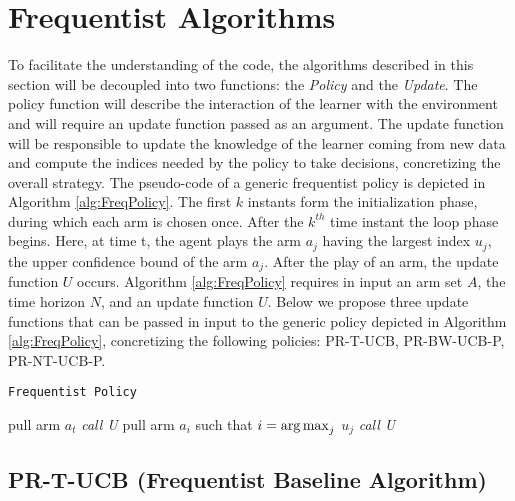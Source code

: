 \section{Frequentist Algorithms}
To facilitate the understanding of the code, the algorithms described in this section will be decoupled into two functions: the \emph{Policy} and the \emph{Update}. The policy function will describe the interaction of the learner with the environment and will require an update function passed as an argument. The update function will be responsible to update the knowledge of the learner coming from new data and compute the indices needed by the policy to take decisions, concretizing the overall strategy. The pseudo-code of a generic frequentist policy is depicted in Algorithm \ref{alg:FreqPolicy}.  The first $k$ instants form the initialization phase, during which  each arm is chosen once. After the $k^{th}$ time instant the loop phase begins. Here, at time t, the agent plays the arm $a_j$ having the largest index $u_j$, the upper confidence bound of the arm $a_j$. After the play of an arm, the update function $U$ occurs.
Algorithm \ref{alg:FreqPolicy} requires in input an arm set $A$, the time horizon $N$, and an update function $U$. Below we propose three update functions that can be passed in input to the generic policy depicted in Algorithm \ref{alg:FreqPolicy}, concretizing the following policies: PR-T-UCB, PR-BW-UCB-P, PR-NT-UCB-P.

\begin{algorithm}[H]
	\caption{\texttt{Frequentist Policy}}
	\begin{scriptsize}
		\begin{algorithmic}[1]						
			 
			\State pull arm $a_t$\;
			\State \emph{call U}\;
			\EndFor
			 
			\State pull arm $a_i$ such that  $i = \operatorname*{arg\,max}_j$ $u_j $\;
			\State \emph{call U}\;
			\EndFor
			\EndFunction			
		\end{algorithmic}
	\end{scriptsize}
	\label{alg:FreqPolicy}
\end{algorithm}



\subsection{PR-T-UCB (Frequentist Baseline Algorithm)}

